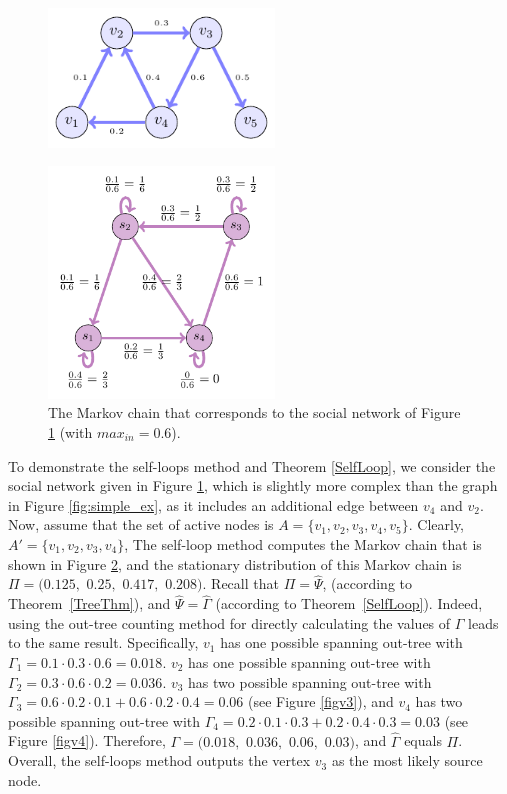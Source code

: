 \documentclass[sigconf,anonymous]{aamas}
\newcommand{\set}[1]{\{#1\}}
\begin{document}


\begin{figure}[hbpt] 
    \centering
    \includegraphics[width= 6cm]{example.pdf}
  \caption{}
    \label{fig:complex_ex}
\end{figure}

\begin{figure}[hbpt] 
    \centering
    \includegraphics[width= 6cm]{self_loop_markov_chain.pdf}
  \caption{The Markov chain that corresponds to the social network of Figure \ref{fig:complex_ex} (with $max_{in}=0.6$).}
    \label{fig self loop mc}
\end{figure}

To demonstrate the self-loops method and Theorem \ref{SelfLoop}, we consider the social network given in Figure \ref{fig:complex_ex}, which is slightly more complex than the graph in Figure \ref{fig:simple_ex}, as it includes an additional edge between $v_4$ and $v_2$.
Now, assume that the set of active nodes is $A= \set{v_1,v_2,v_3,v_4,v_5}$.
Clearly, $A'=\set{v_1,v_2,v_3,v_4}$, 
The self-loop method computes
the Markov chain that is shown in Figure \ref{fig self loop mc},
and the stationary distribution of this Markov chain is $\Pi = (0.125,$ $0.25,$ $0.417,$ $0.208)$. Recall that $\Pi= \hat{\Psi}$, (according to Theorem~\ref{TreeThm}), and $\hat{\Psi}=\hat{\Gamma}$ (according to Theorem~\ref{SelfLoop}).
Indeed, using the out-tree counting method for directly calculating the values of $\Gamma$ leads to the same result. Specifically, $v_1$ has one possible spanning out-tree with $\Gamma_1 = 0.1\cdot 0.3 \cdot 0.6 = 0.018$. $v_2$ has one possible spanning out-tree with $\Gamma_2= 0.3\cdot 0.6\cdot 0.2=0.036$. $v_3$ has two possible spanning out-tree with $\Gamma_3 =0.6\cdot 0.2 \cdot 0.1 +0.6\cdot 0.2 \cdot 0.4=0.06$ (see Figure \ref{figv3}), and $v_4$ has two possible spanning out-tree with $\Gamma_4 =0.2\cdot 0.1 \cdot 0.3 +0.2\cdot 0.4 \cdot 0.3=0.03$ (see Figure \ref{figv4}). Therefore, $\Gamma = (0.018,$ $0.036,$ $0.06,$ $0.03)$, and $\hat{\Gamma}$ equals $\Pi$. Overall, the self-loops method outputs the vertex $v_3$ as the most likely source node.
\end{document}
